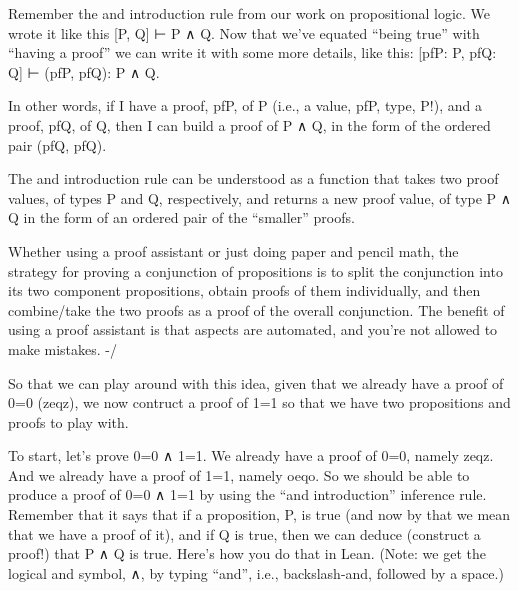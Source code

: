 \documentclass[letterpaper,10pt,english]{sphinxmanual}
\begin{document}
Remember the and introduction rule from our work on propositional
logic. We wrote it like this {[}P, Q{]} ⊢ P ∧ Q. Now that we’ve equated
“being true” with “having a proof” we can write it with some more
details, like this: {[}pfP: P, pfQ: Q{]} ⊢ (pfP, pfQ): P ∧ Q.

In other words, if I have a proof, pfP, of P (i.e., a value, pfP,
type, P!), and a proof, pfQ, of Q, then I can build a proof of P ∧ Q,
in the form of the ordered pair (pfQ, pfQ).

The and introduction rule can be understood as a function that takes
two proof values, of types P and Q, respectively, and returns a new
proof value, of type P ∧ Q in the form of an ordered pair of the
“smaller” proofs.

Whether using a proof assistant or just doing paper and pencil math,
the strategy for proving a conjunction of propositions is to split the
conjunction into its two component propositions, obtain proofs of them
individually, and then combine/take the two proofs as a proof of the
overall conjunction. The benefit of using a proof assistant is that
aspects are automated, and you’re not allowed to make mistakes.  -/

So that we can play around with this idea, given that we already have
a proof of 0=0 (zeqz), we now contruct a proof of 1=1 so that we have
two propositions and proofs to play with.

\begin{sphinxVerbatim}[commandchars=\\\{\}]
 
\end{sphinxVerbatim}

\begin{sphinxVerbatim}[commandchars=\\\{\}]
       
\end{sphinxVerbatim}

To start, let’s prove 0=0 ∧ 1=1. We already have a proof of 0=0,
namely zeqz.  And we already have a proof of 1=1, namely oeqo. So we
should be able to produce a proof of 0=0 ∧ 1=1 by using the “and
introduction” inference rule. Remember that it says that if a
proposition, P, is true (and now by that we mean that we have a proof
of it), and if Q is true, then we can deduce (construct a proof!)
that P ∧ Q is true. Here’s how you do that in Lean. (Note: we get the
logical and symbol, ∧, by typing “and”, i.e., backslash-and, followed
by a space.)
\end{document}
